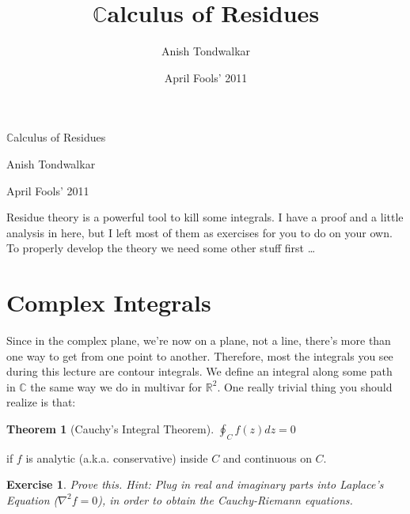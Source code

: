 \documentclass[11pt,notitlepage]{article}
\title{$\mathbb{C}$alculus of Residues}
\author{Anish Tondwalkar}
\date{April Fools' 2011}
\newtheorem{thm}{Theorem}[section]
\newtheorem{exc}{Exercise}[section]
\begin{document}
\begin{center}
\Large{$\mathbb{C}$alculus of Residues}
\par
\large{Anish Tondwalkar}
\par
\small{April Fools' 2011}
\end{center}
Residue theory is a powerful tool to kill some integrals.  I have a proof and a little analysis in here, but I left most of them as exercises for you to do on your own.  To properly develop the theory we need some other stuff first \ldots
\section{Complex Integrals}
Since in the complex plane, we're now on a plane, not a line, there's more than one way to get from one point to another. Therefore, most the integrals you see during this lecture are contour integrals. We define an integral along some path in $\mathbb{C}$ the same way we do in multivar for $\mathbb{R}^2$. One really trivial thing you should realize is that:
\begin{thm}[Cauchy's Integral Theorem]
$\oint_C f(z) dz = 0$ 
\end{thm}
\begin{flushright}
if $f$ is analytic (a.k.a.\! conservative) inside $C$ and continuous on $C$.
\end{flushright}
\begin{exc}
Prove this. Hint: Plug in real and imaginary parts into Laplace's Equation ($\nabla^2f=0$), in order to obtain the Cauchy-Riemann equations. 
\end{exc}
\end{document}
